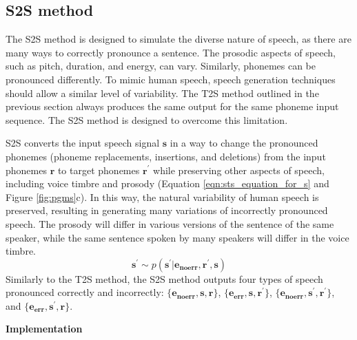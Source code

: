 \documentclass[]{interact}
\theoremstyle{plain}%
\theoremstyle{definition}
\theoremstyle{remark}
\begin{document}
\subsection{S2S method}
\label{sec:s2s_method}

The S2S method is designed to simulate the diverse nature of speech, as there are many ways to correctly pronounce a sentence. The prosodic aspects of speech, such as pitch, duration, and energy, can vary. Similarly, phonemes can be pronounced differently. To mimic human speech, speech generation techniques should allow a similar level of variability. The T2S method outlined in the previous section always produces the same output for the same phoneme input sequence. The S2S method is designed to overcome this limitation.

S2S converts the input speech signal $\mathbf{s}$ in a way to change the pronounced phonemes (phoneme replacements, insertions, and deletions) from the input phonemes $\mathbf{r}$ to target phonemes $\mathbf{r^{'}}$ while preserving other aspects of speech, including voice timbre and prosody (Equation \ref{eqn:sts_equation_for_s} and Figure \ref{fig:pgms}c). In this way, the natural variability of human speech is preserved, resulting in generating many variations of incorrectly pronounced speech. The prosody will differ in various versions of the sentence of the same speaker, while the same sentence spoken by many speakers will differ in the voice timbre. 
\begin{equation}
 \mathbf{s^{'}} \sim p(\mathbf{s^{'}}|\mathbf{e_{noerr}},\mathbf{r^{'}}, \mathbf{s})
 \label{eqn:sts_equation_for_s}
\end{equation}
Similarly to the T2S method, the S2S method outputs four types of speech pronounced correctly and incorrectly: $\{\mathbf{e_{noerr}}, \mathbf{s},\mathbf{r}\}$, $\{\mathbf{e_{err}}, \mathbf{s},\mathbf{r^{'}}\}$, $\{\mathbf{e_{noerr}}, \mathbf{s^{'}},\mathbf{r^{'}}\}$, and $\{\mathbf{e_{err}}, \mathbf{s^{'}},\mathbf{r}\}$.

\bigskip

\textbf{Implementation}

\bigskip
\end{document}
